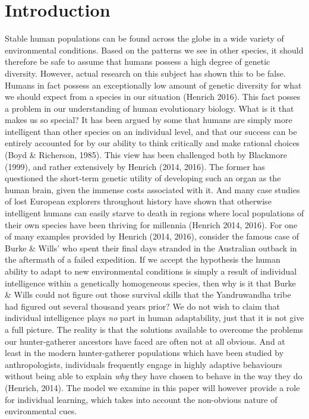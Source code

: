 \documentclass[a4paper,8pt]{extarticle}
\begin{document}
\section{Introduction}
Stable human populations can be found across the globe in a wide variety of environmental conditions. Based on the patterns we see in other species, it should therefore be safe to assume that humans possess a high degree of genetic diversity. However, actual research on this subject has shown this to be false. Humans in fact possess an exceptionally low amount of genetic diversity for what we should expect from a species in our situation (Henrich 2016). This fact posses a problem in our understanding of human evolutionary biology. What is it that makes us so special? It has been argued by some that humans are simply more intelligent than other species on an individual level, and that our success can be entirely accounted for by our ability to think critically and make rational choices (Boyd \& Richerson, 1985). This view has been challenged both by Blackmore (1999), and rather extensively by Henrich (2014, 2016). The former has questioned the short-term genetic utility of developing such an organ as the human brain, given the immense costs associated with it. And many case studies of lost European explorers throughout history have shown that otherwise intelligent humans can easily starve to death in regions where local populations of their own species have been thriving for millennia (Henrich 2014, 2016). For one of many examples provided by Henrich (2014, 2016), consider the famous case of Burke \& Wills' who spent their final days stranded in the Australian outback in the aftermath of a failed expedition. If we accept the hypothesis the human ability to adapt to new environmental conditions is simply a result of individual intelligence within a genetically homogeneous species, then why is it that Burke \& Wills could not figure out those survival skills that the Yandruwandha tribe had figured out several thousand years prior? We do not wish to claim that individual intelligence plays \emph{no} part in human adaptability, just that it is not give a full picture. The reality is that the solutions available to overcome the problems our hunter-gatherer ancestors have faced are often not at all obvious. And at least in the modern hunter-gatherer populations which have been studied by anthropologists, individuals frequently engage in highly adaptive behaviours without being able to explain \emph{why} they have chosen to behave in the way they do (Henrich, 2014). The model we examine in this paper will however provide a role for individual learning, which takes into account the non-obvious nature of environmental cues.
\end{document}
